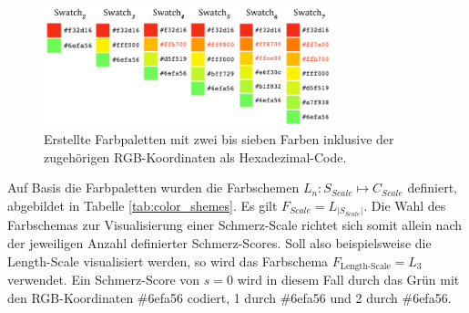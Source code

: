 \begin{figure}[h]
	\centering
	\includegraphics[width=0.75\textwidth]{bilder/colorpics.png}
	\caption[Farbpaletten mit zwei bis sieben Farben ]{Erstellte Farbpaletten mit zwei bis sieben Farben inklusive der zugehörigen RGB-Koordinaten als Hexadezimal-Code.}
	\label{fig:color-swatches}
\end{figure}

Auf Basis die Farbpaletten wurden die Farbschemen $L_{n}: S_{Scale} \mapsto C_{Scale}$ definiert, abgebildet in Tabelle \ref{tab:color_shemes}. Es gilt $F_{Scale} = L_{|S_{Scale}|}$. Die Wahl des Farbschemas zur Visualisierung einer Schmerz-Scale richtet sich somit allein nach der jeweiligen Anzahl definierter Schmerz-Scores. Soll also beispielsweise die Length-Scale visualisiert werden, so wird das Farbschema $F_{\text{Length-Scale}} = L_3$ verwendet. Ein Schmerz-Score von $s = 0$ wird in diesem Fall durch das Grün mit den RGB-Koordinaten \#6efa56 codiert, 1 durch \#6efa56 und 2 durch \#6efa56.

